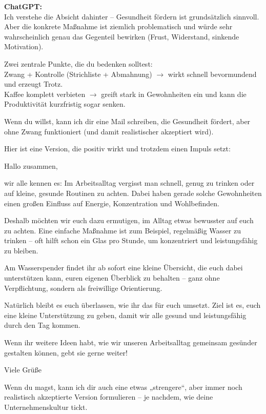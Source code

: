 \begin{kichat}
\textbf{ChatGPT:}\\
Ich verstehe die Absicht dahinter – Gesundheit fördern ist grundsätzlich sinnvoll. Aber die konkrete Maßnahme ist ziemlich problematisch und würde sehr wahrscheinlich genau das Gegenteil bewirken (Frust, Widerstand, sinkende Motivation).

Zwei zentrale Punkte, die du bedenken solltest:\\
Zwang + Kontrolle (Strichliste + Abmahnung) $\rightarrow$ wirkt schnell bevormundend und erzeugt Trotz.\\
Kaffee komplett verbieten $\rightarrow$ greift stark in Gewohnheiten ein und kann die Produktivität kurzfristig sogar senken.

Wenn du willst, kann ich dir eine Mail schreiben, die Gesundheit fördert, aber ohne Zwang funktioniert (und damit realistischer akzeptiert wird).

Hier ist eine Version, die positiv wirkt und trotzdem einen Impuls setzt:

Hallo zusammen,

wir alle kennen es: Im Arbeitsalltag vergisst man schnell, genug zu trinken oder auf kleine, gesunde Routinen zu achten. Dabei haben gerade solche Gewohnheiten einen großen Einfluss auf Energie, Konzentration und Wohlbefinden.

Deshalb möchten wir euch dazu ermutigen, im Alltag etwas bewusster auf euch zu achten. Eine einfache Maßnahme ist zum Beispiel, regelmäßig Wasser zu trinken – oft hilft schon ein Glas pro Stunde, um konzentriert und leistungsfähig zu bleiben.

Am Wasserspender findet ihr ab sofort eine kleine Übersicht, die euch dabei unterstützen kann, euren eigenen Überblick zu behalten – ganz ohne Verpflichtung, sondern als freiwillige Orientierung.

Natürlich bleibt es euch überlassen, wie ihr das für euch umsetzt. Ziel ist es, euch eine kleine Unterstützung zu geben, damit wir alle gesund und leistungsfähig durch den Tag kommen.

Wenn ihr weitere Ideen habt, wie wir unseren Arbeitsalltag gemeinsam gesünder gestalten können, gebt sie gerne weiter!

Viele Grüße\\

Wenn du magst, kann ich dir auch eine etwas „strengere“, aber immer noch realistisch akzeptierte Version formulieren – je nachdem, wie deine Unternehmenskultur tickt.
\end{kichat}

